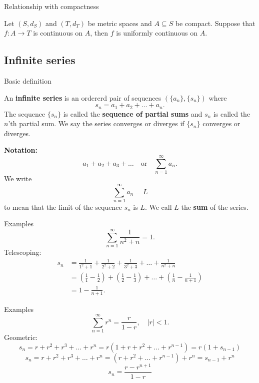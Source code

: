 \documentclass{beamer}
\begin{document}
\begin{frame}{Relationship with compactness}

\begin{thm}[Heine]
Let $(S,d_S)$ and $(T,d_T)$ be metric spaces and $A\subseteq S$ be compact.
Suppose that $f: A\rightarrow T$ is continuous on $A$, then $f$ is uniformly continuous on $A$.
\end{thm}
\end{frame}


\subsection{Infinite series}

\begin{frame}{Basic definition}
\begin{defn}
An \textbf{infinite series} is an ordererd pair of sequences $(\{a_n\},\{s_n\})$ where 
$$s_n = a_1+a_2+\dots+a_n.$$
The sequence $\{s_n\}$ is called the \textbf{sequence of partial sums} and $s_n$ is called the $n$'th partial sum.
We say the series converges or diverges if $\{s_n\}$ converges or diverges.
\end{defn}
\textbf{Notation:}
$$a_1+a_2+a_3+\dots\quad\text{or}\quad \sum_{n=1}^\infty a_n.$$
We write
$$\sum_{n=1}^\infty a_n = L$$
to mean that the limit of the sequence $s_n$ is $L$.
We call $L$ the \textbf{sum} of the series.
\end{frame}

\begin{frame}{Examples}
$$\sum_{n=1}^\infty \frac{1}{n^2+n} = 1.$$
\pause
Telescoping:
\pause
\begin{align*}
s_n &= \frac{1}{1^2+1} + \frac{1}{2^2+2} +  \frac{1}{3^2+3} + \dots + \frac{1}{n^2+n}\\
    &= \left(\frac{1}{1}-\frac{1}{2}\right) + \left(\frac{1}{2}-\frac{1}{3}\right) +\dots+ \left(\frac{1}{n}-\frac{1}{n+1}\right)\\
    &= 1-\frac{1}{n+1}.
\end{align*}
\end{frame}

\begin{frame}{Examples}
$$\sum_{n=1}^\infty r^n = \frac{r}{1-r},\quad |r| < 1.$$
\pause
Geometric:
\pause
$$s_n = r + r^2 + r^3 + \dots + r^n= r(1+r+r^2+\dots+r^{n-1}) = r(1+s_{n-1})$$
\pause
$$s_n = r + r^2 + r^3 + \dots + r^n= (r+r^2+\dots+r^{n-1}) + r^n = s_{n-1} + r^n$$
\pause
$$s_n = \frac{r-r^{n+1}}{1-r}$$
\end{frame}
\end{document}
